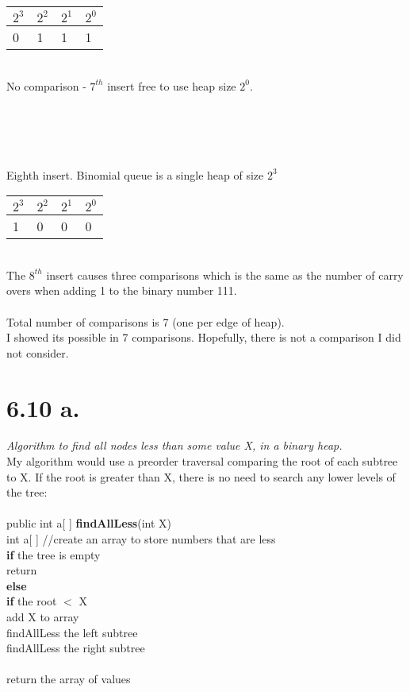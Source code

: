 \documentclass[12pt,letterpaper]{article}
\begin{document}
\begin{tabular}{ |l|l|l|l| }
   \hline
   $2^3$  & $2^2$  & $2^1$  & $2^0$ \\ \hline
    0 & 1 & 1 & 1 \\
   \hline
 \end{tabular}\\No comparison - $7^{th}$ insert free to use heap size $2^0$.\\\\\\
\\\\
Eighth insert. Binomial queue is a single heap of size $2^3$
\begin{tabular}{ |l|l|l|l| }
   \hline
   $2^3$  & $2^2$  & $2^1$  & $2^0$ \\ \hline
    1 & 0 & 0 & 0 \\
   \hline
 \end{tabular}\\
The $8^{th}$ insert causes three comparisons which is the same as the number of carry overs when adding 1 to the binary number 111.\\\\
Total number of comparisons is 7 (one per edge of heap).\\
I showed its possible in 7 comparisons. Hopefully, there is not a comparison I did not consider.
\newpage
\section*{6.10 a.}
\textit{Algorithm to find all nodes less than some value X, in a binary heap.}\\
My algorithm would use a preorder traversal comparing the root of each subtree to X. If the root is greater than X, there is no need to search any lower levels of the tree:\\\\
public int a[ ] \textbf{findAllLess}(int X)\\
int a[ ] //create an array to store numbers that are less\\
\textbf{if} the tree is empty\\
\hspace*{.25 in}return\\
\textbf{else}\\
\hspace*{.25 in}\textbf{if} the root $<$ X\\
\hspace*{.5 in}add X to array\\
\hspace*{.5 in}findAllLess the left subtree\\
\hspace*{.5 in}findAllLess the right subtree\\\\
return the array of values
\end{document}
